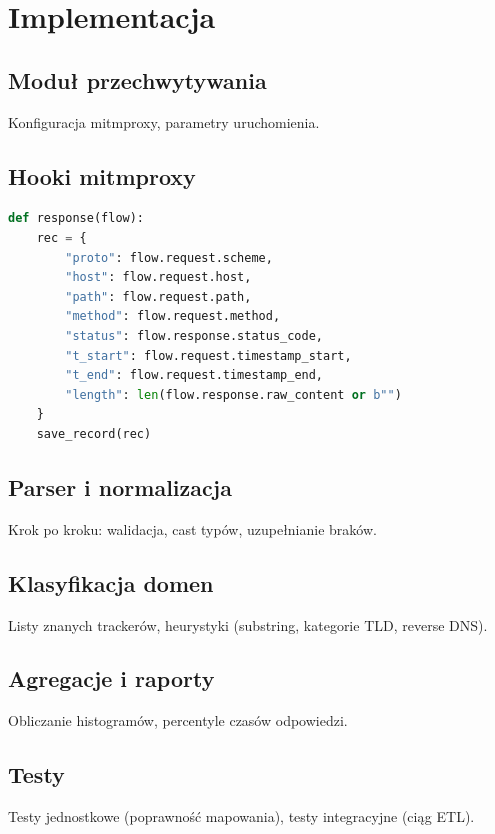 \chapter{Implementacja}

\section{Moduł przechwytywania}
Konfiguracja mitmproxy, parametry uruchomienia.

\section{Hooki mitmproxy}
\begin{lstlisting}[language=Python,caption={Hook mitmproxy zapisujący metadane żądań},label={lst:hook}]
def response(flow):
    rec = {
        "proto": flow.request.scheme,
        "host": flow.request.host,
        "path": flow.request.path,
        "method": flow.request.method,
        "status": flow.response.status_code,
        "t_start": flow.request.timestamp_start,
        "t_end": flow.request.timestamp_end,
        "length": len(flow.response.raw_content or b"")
    }
    save_record(rec)
\end{lstlisting}

\section{Parser i normalizacja}
Krok po kroku: walidacja, cast typów, uzupełnianie braków.

\section{Klasyfikacja domen}
Listy znanych trackerów, heurystyki (substring, kategorie TLD, reverse DNS).

\section{Agregacje i raporty}
Obliczanie histogramów, percentyle czasów odpowiedzi.

\section{Testy}
Testy jednostkowe (poprawność mapowania), testy integracyjne (ciąg ETL).